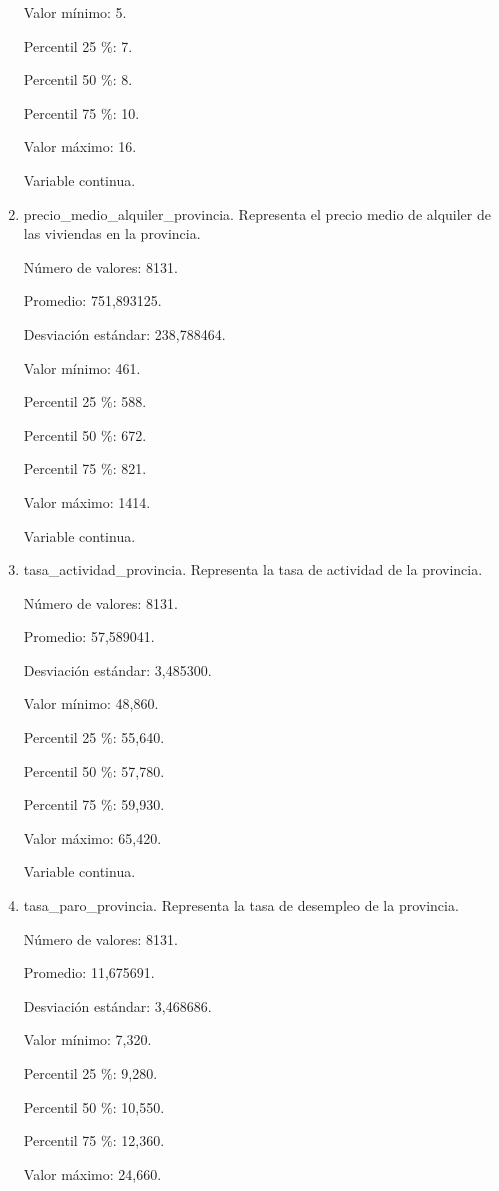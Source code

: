 \begin{enumerate}
	Valor mínimo: 5.
	
	Percentil 25 \%: 7.
	
	Percentil 50 \%: 8.
	
	Percentil 75 \%: 10.
	
	Valor máximo: 16.
	
	Variable continua.

	\item precio\_medio\_alquiler\_provincia. Representa el precio medio de alquiler de las viviendas en la provincia.
	
	Número de valores: 8131.
	
	Promedio: 751,893125.
	
	Desviación estándar: 238,788464.
	
	Valor mínimo: 461.
	
	Percentil 25 \%: 588.
	
	Percentil 50 \%: 672.
	
	Percentil 75 \%: 821.
	
	Valor máximo: 1414.
	
	Variable continua.

	\item tasa\_actividad\_provincia. Representa la tasa de actividad de la provincia.
	
	Número de valores: 8131.
	
	Promedio: 57,589041.
	
	Desviación estándar: 3,485300.
	
	Valor mínimo: 48,860.
	
	Percentil 25 \%: 55,640.
	
	Percentil 50 \%: 57,780.
	
	Percentil 75 \%: 59,930.
	
	Valor máximo: 65,420.
	
	Variable continua.

	\item tasa\_paro\_provincia. Representa la tasa de desempleo de la provincia.
	
	Número de valores: 8131.
	
	Promedio: 11,675691.
	
	Desviación estándar: 3,468686.
	
	Valor mínimo: 7,320.
	
	Percentil 25 \%: 9,280.
	
	Percentil 50 \%: 10,550.
	
	Percentil 75 \%: 12,360.
	
	Valor máximo: 24,660.
	

\end{enumerate}
